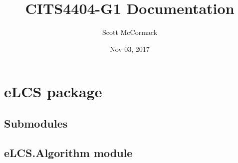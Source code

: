 \documentclass[letterpaper,10pt,english]{sphinxmanual}
\title{CITS4404-G1 Documentation}
\date{Nov 03, 2017}
\author{Scott McCormack}
\begin{document}
\maketitle
\sphinxtableofcontents
{}\label{\detokenize{index::doc}}



\chapter{eLCS package}
\label{\detokenize{eLCS::doc}}\label{\detokenize{eLCS:welcome-to-cits4404-g1-s-documentation}}\label{\detokenize{eLCS:elcs-package}}

\section{Submodules}
\label{\detokenize{eLCS:submodules}}

\section{eLCS.Algorithm module}
\label{\detokenize{eLCS:module-eLCS.Algorithm}}\label{\detokenize{eLCS:elcs-algorithm-module}}
\end{document}

